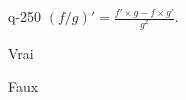 \begin{truefalse}{q-250}
$(f / g)' = \frac{f'\times g - f\times g'}{g^2}$.
\item* Vrai
\item Faux
\end{truefalse}

